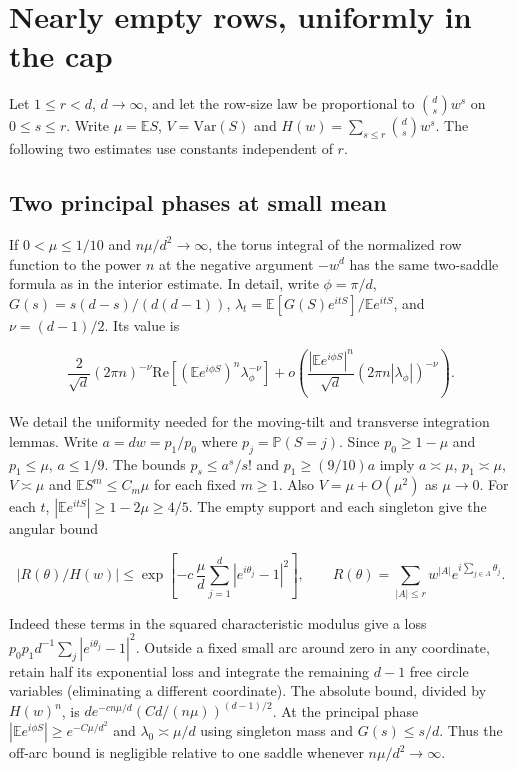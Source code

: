 \section{Nearly empty rows, uniformly in the cap}\label{sec:nearly-empty}

Let $1\le r<d$, $d\to\infty$, and let the row-size law be proportional to $\binom ds w^s$ on $0\le s\le r$. Write $\mu=\mathbb E S$, $V=\mathrm{Var}(S)$ and $H(w)=\sum_{s\le r}\binom ds w^s$. The following two estimates use constants independent of $r$.

\subsection{Two principal phases at small mean}

If $0<\mu\le1/10$ and $n\mu/d^2\to\infty$, the torus integral of the normalized row function to the power $n$ at the negative argument $-w^d$ has the same two-saddle formula as in the interior estimate. In detail, write $\phi=\pi/d$, $G(s)=s(d-s)/(d(d-1))$, $\lambda_t=\mathbb E[G(S)e^{itS}]/\mathbb E e^{itS}$, and $\nu=(d-1)/2$. Its value is

\begin{equation*}
\frac{2}{\sqrt d}(2\pi n)^{-\nu}
\mathrm{Re}\!\left[(\mathbb E e^{i\phi S})^n\lambda_\phi^{-\nu}\right]
+o\!\left(\frac{|\mathbb E e^{i\phi S}|^n}{\sqrt d}(2\pi n|\lambda_\phi|)^{-\nu}\right).
\end{equation*}

We detail the uniformity needed for the moving-tilt and transverse integration lemmas. Write $a=dw=p_1/p_0$ where $p_j=\mathbb P(S=j)$. Since $p_0\ge1-\mu$ and $p_1\le\mu$, $a\le1/9$. The bounds $p_s\le a^s/s!$ and $p_1\ge(9/10)a$ imply $a\asymp\mu$, $p_1\asymp\mu$, $V\asymp\mu$ and $\mathbb E S^m\le C_m\mu$ for each fixed $m\ge1$. Also $V=\mu+O(\mu^2)$ as $\mu\to0$. For each $t$, $|\mathbb E e^{itS}|\ge1-2\mu\ge4/5$. The empty support and each singleton give the angular bound

\begin{equation*}
|R(\theta)/H(w)|\le\exp\!\left[-c\,\frac{\mu}{d}\sum_{j=1}^d|e^{i\theta_j}-1|^2\right],
\qquad R(\theta)=\sum_{|A|\le r}w^{|A|} e^{i\sum_{j\in A}\theta_j}.
\end{equation*}

Indeed these terms in the squared characteristic modulus give a loss $p_0p_1 d^{-1}\sum_j|e^{i\theta_j}-1|^2$. Outside a fixed small arc around zero in any coordinate, retain half its exponential loss and integrate the remaining $d-1$ free circle variables (eliminating a different coordinate). The absolute bound, divided by $H(w)^n$, is $d e^{-c n\mu/d}(C d/(n\mu))^{(d-1)/2}$. At the principal phase $|\mathbb E e^{i\phi S}|\ge e^{-C\mu/d^2}$ and $\lambda_0\asymp\mu/d$ using singleton mass and $G(s)\le s/d$. Thus the off-arc bound is negligible relative to one saddle whenever $n\mu/d^2\to\infty$.

